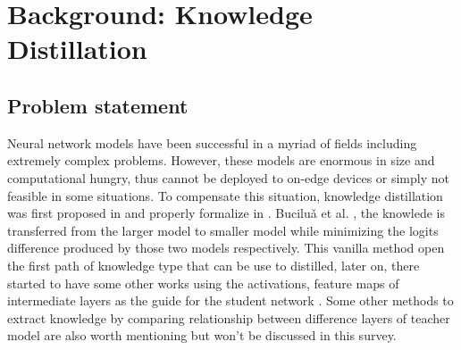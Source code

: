 \section{Background: Knowledge Distillation}

\subsection{Problem statement}
Neural network models have been successful in a myriad of fields including extremely complex problems. However, these models are enormous in size and computational hungry, thus cannot be deployed to on-edge devices or simply not feasible in some situations. To compensate this situation, knowledge distillation was first proposed in \cite{firstkdpaper} and properly formalize in \cite{hintonfirstkd}. Buciluǎ et al. \cite{firstkdpaper}, the knowlede is transferred from the larger model to smaller model while minimizing the logits difference produced by those two models respectively. This vanilla method open the first path of knowledge type that can be use to distilled, later on, there started to have some other works using the activations, feature maps of intermediate layers as the guide for the student network \cite{featurebased01, featurebased02_AT,featurebased03_relu}. Some other methods to extract knowledge by comparing relationship between difference layers of teacher model \cite{relbase01, relbase02} are also worth mentioning but won't be discussed in this survey.


